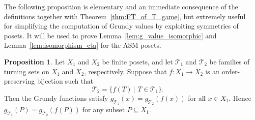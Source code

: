 \documentclass[a4paper,11pt]{amsart}
\theoremstyle{definition}
\newtheorem{prop}{Proposition}[section]
\newenvironment{demo}[1]{%
  \trivlist
  \item[\hskip\labelsep
        {\bf #1.}]
}{%
\hfill\qedsymbol
  \endtrivlist
}
\numberwithin{equation}{section}
\def\T{\mathscr{T}}
\def\rkf{\rho}
\begin{document}
The following proposition is elementary and an immediate consequence of the definitions together with Theorem~\ref{thm:FT_of_T_game},
but extremely useful for simplifying the computation of Grundy values by exploiting symmetries of posets.
It will be used to prove Lemma~\ref{lem:g_value_isomorphic} and Lemma~\ref{lem:isomorphism_eta} 
for the ASM posets.
%
\begin{prop}\label{prop:g_value_order_isomorphism_general}
	Let $X_{1}$ and $X_{2}$ be finite posets, and let $\T_{1}$ and $\T_{2}$ be families of turning sets on $X_{1}$ and $X_{2}$, respectively.
	Suppose that $f:X_{1}\to X_{2}$ is an order-preserving bijection such that
\begin{equation}\label{eq:iso-T}
\T_{2}=\{f\left(T\right)\mid T\in \T_{1}\}.
\end{equation}
Then the Grundy functions satisfy
	$
		g_{\T_{1}}\left( x \right) 
		= 
		g_{\T_{2}}\left( f(x) \right)
	$
	for all $x\in X_{1}$.
	Hence $g_{\T_{1}}\left( P \right)=g_{\T_{2}}\left( f(P) \right)$ for any subset $P\subseteq X_{1}$.
\end{prop}
%
%
%
%
%
%
%
%
%
\end{document}
